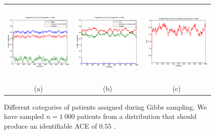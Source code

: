 \documentclass[a4paper, 10pt]{article}
\begin{document}
\begin{figure}
\begin{tabular}{ccc}
 \includegraphics[width=4.5cm,height=4cm,bb=103 240 500
555]{takingtype_case0.55_n=1000.eps} &
 \includegraphics[width=4.5cm,height=4cm,bb=103 240 500 555]
{healingtype_case0.55_n=1000.eps} &
 \includegraphics[width=4.5cm,height=4cm,bb=103 240
500 555]{sampledACEs_case0.55_n=1000.eps} \\
(a) & (b) & (c)
\end{tabular}
\caption{Different categories of patients assigned during Gibbs sampling. We
have sampled $n=1\ 000$ patients from a distribution that should produce an
identifiable ACE of $0.55$ .}
\label{fig:n=1000_case0.55}
\end{figure}
\end{document}
